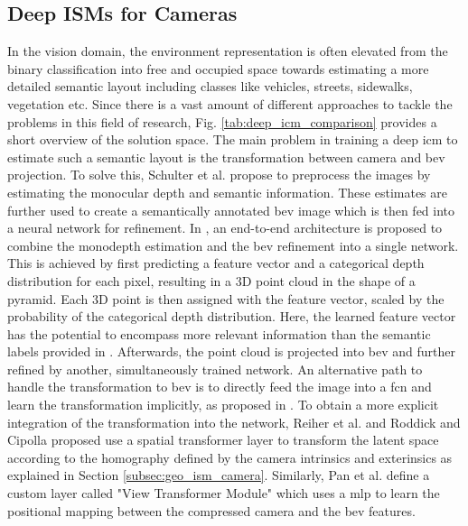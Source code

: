 \subsection{Deep ISMs for Cameras}
\label{subsec:deep_ism_camera}
In the vision domain, the environment representation is often elevated from the binary classification into free and occupied space towards estimating a more detailed semantic layout including classes like vehicles, streets, sidewalks, vegetation etc. Since there is a vast amount of different approaches to tackle the problems in this field of research, Fig. \ref{tab:deep_icm_comparison} provides a short overview of the solution space.
The main problem in training a deep \gls{icm} to estimate such a semantic layout is the transformation between camera and \gls{bev} projection. To solve this, Schulter et al. \cite{schulter2018learning} propose to preprocess the images by estimating the monocular depth and semantic information. These estimates are further used to create a semantically annotated \gls{bev} image which is then fed into a neural network for refinement. In \cite{philion2020lift}, an end-to-end architecture is proposed to combine the \gls{monodepth} estimation and the \gls{bev} refinement into a single network. This is achieved by first predicting a feature vector and a categorical depth distribution for each pixel, resulting in a 3D point cloud in the shape of a pyramid. Each 3D point is then assigned with the feature vector, scaled by the probability of the categorical depth distribution. Here, the learned feature vector has the potential to encompass more relevant information than the semantic labels provided in \cite{schulter2018learning}. Afterwards, the point cloud is projected into \gls{bev} and further refined by another, simultaneously trained network. An alternative path to handle the transformation to \gls{bev} is to directly feed the image into a \gls{fcn} and learn the transformation implicitly, as proposed in \cite{mani2020monolayout,lu2019monocular}. To obtain a more explicit integration of the transformation into the network, Reiher et al. \cite{reiher2020sim2real} and Roddick and Cipolla \cite{roddick2020predicting} proposed use a spatial transformer layer \cite{jaderberg2015spatial} to transform the latent space according to the homography defined by the camera intrinsics and exterinsics as explained in Section \ref{subsec:geo_ism_camera}. Similarly, Pan et al. \cite{pan2020cross} define a custom layer called "View Transformer Module" which uses a \gls{mlp} to learn the positional mapping between the compressed camera and the \gls{bev} features.
